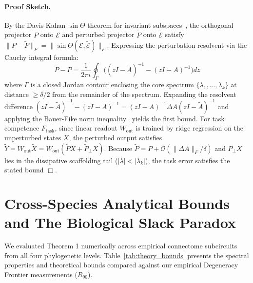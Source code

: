 \documentclass[11pt,letterpaper]{report}
\begin{document}
\paragraph{Proof Sketch.}
By the Davis-Kahan $\sin\Theta$ theorem for invariant subspaces~\cite{daviskahan1970rotation, stewart1990matrix}, the orthogonal projector $P$ onto $\mathcal{E}$ and perturbed projector $\tilde{P}$ onto $\tilde{\mathcal{E}}$ satisfy $\|P - \tilde{P}\|_F = \|\sin\Theta(\mathcal{E}, \tilde{\mathcal{E}})\|_F$. Expressing the perturbation resolvent via the Cauchy integral formula:
\begin{equation}
\tilde{P} - P = \frac{1}{2\pi i} \oint_{\Gamma} \Big( (zI - \tilde{A})^{-1} - (zI - A)^{-1} \Big) dz
\end{equation}
where $\Gamma$ is a closed Jordan contour enclosing the core spectrum $\{\lambda_1, \dots, \lambda_k\}$ at distance $\ge \delta/2$ from the remainder of the spectrum. Expanding the resolvent difference $(zI - \tilde{A})^{-1} - (zI - A)^{-1} = (zI - A)^{-1} \Delta A (zI - \tilde{A})^{-1}$ and applying the Bauer-Fike norm inequality~\cite{bauerfike1960norms} yields the first bound. For task competence $F_{\mathrm{task}}$, since linear readout $W_{\mathrm{out}}$ is trained by ridge regression on the unperturbed states $X$, the perturbed output satisfies $\tilde{Y} = W_{\mathrm{out}} \tilde{X} = W_{\mathrm{out}} (\tilde{P} X + \tilde{P}_{\perp} X)$. Because $\tilde{P} = P + \mathcal{O}(\|\Delta A\|_F / \delta)$ and $P_{\perp} X$ lies in the dissipative scaffolding tail ($|\lambda| < |\lambda_k|$), the task error satisfies the stated bound $\Box$.

\section{Cross-Species Analytical Bounds and The Biological Slack Paradox}

We evaluated Theorem 1 numerically across empirical connectome subcircuits from all four phylogenetic levels. Table~\ref{tab:theory_bounds} presents the spectral properties and theoretical bounds compared against our empirical Degeneracy Frontier measurements ($R_{90}$).
\end{document}
